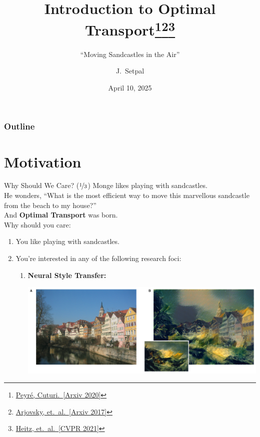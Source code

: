 \documentclass{beamer}
\title[Optimal Transport]{Introduction to Optimal Transport\thanks{\href{https://arxiv.org/abs/1803.00567}{Peyré, Cuturi.~[Arxiv 2020]}}\thanks{\href{https://arxiv.org/abs/1701.07875}{Arjovsky, et.~al.~[Arxiv 2017]}}\thanks{\href{https://arxiv.org/abs/2006.07229}{Heitz, et.~al.~[CVPR 2021]}}}
\subtitle{``Moving Sandcastles in the Air''}
\author[Machine Learning @ Purdue] %
{J.~Setpal}
\date{April 10, 2025}
\begin{document}
\frame{\titlepage}


\begin{frame}
\frametitle{Outline}
\tableofcontents
\end{frame}

\section{Motivation}

\begin{frame}{Why Should We Care? ($\nicefrac{1}{3}$)}
	Monge likes playing with sandcastles. \newline \\

	He wonders, ``What is the most efficient way to move this marvellous sandcastle from the beach to my house?'' \newline \\

	And \textbf{Optimal Transport} was born. \pause \newline \\

	Why should you care:
	\begin{enumerate}[label=\arabic*.]
		\item You like playing with sandcastles. \pause
		\item You're interested in any of the following research foci:
			\begin{enumerate}[label=\alph*.]
				\item \bf Neural Style Transfer:
					\begin{center}
						\includegraphics[width=.6\textwidth]{img/styletransfer.png}
					\end{center}
			\end{enumerate}
	\end{enumerate}
\end{frame}
\end{document}
